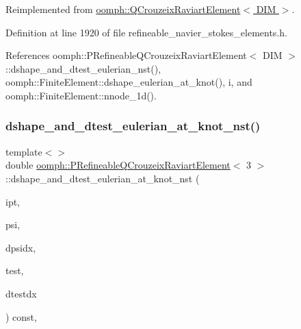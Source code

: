 Reimplemented from \hyperlink{classoomph_1_1QCrouzeixRaviartElement_a3c4261300b81aae3ac358198b3e11906}{oomph\+::\+Q\+Crouzeix\+Raviart\+Element$<$ D\+I\+M $>$}.



Definition at line 1920 of file refineable\+\_\+navier\+\_\+stokes\+\_\+elements.\+h.



References oomph\+::\+P\+Refineable\+Q\+Crouzeix\+Raviart\+Element$<$ D\+I\+M $>$\+::dshape\+\_\+and\+\_\+dtest\+\_\+eulerian\+\_\+nst(), oomph\+::\+Finite\+Element\+::dshape\+\_\+eulerian\+\_\+at\+\_\+knot(), i, and oomph\+::\+Finite\+Element\+::nnode\+\_\+1d().

\mbox{\label{classoomph_1_1PRefineableQCrouzeixRaviartElement_a1694309d7e0bc7ddd2691784c37cc2f0}} 
\subsubsection{\texorpdfstring{dshape\+\_\+and\+\_\+dtest\+\_\+eulerian\+\_\+at\+\_\+knot\+\_\+nst()}{dshape\_and\_dtest\_eulerian\_at\_knot\_nst()}\hspace{0.1cm}{\footnotesize\ttfamily [3/3]}}
{\footnotesize\ttfamily template$<$$>$ \\
double \hyperlink{classoomph_1_1PRefineableQCrouzeixRaviartElement}{oomph\+::\+P\+Refineable\+Q\+Crouzeix\+Raviart\+Element}$<$ 3 $>$\+::dshape\+\_\+and\+\_\+dtest\+\_\+eulerian\+\_\+at\+\_\+knot\+\_\+nst (\begin{DoxyParamCaption}\item[{const unsigned \&}]{ipt,  }\item[{\hyperlink{classoomph_1_1Shape}{Shape} \&}]{psi,  }\item[{\hyperlink{classoomph_1_1DShape}{D\+Shape} \&}]{dpsidx,  }\item[{\hyperlink{classoomph_1_1Shape}{Shape} \&}]{test,  }\item[{\hyperlink{classoomph_1_1DShape}{D\+Shape} \&}]{dtestdx }\end{DoxyParamCaption}) const\hspace{0.3cm}{\ttfamily [inline]}, {\ttfamily [virtual]}}

